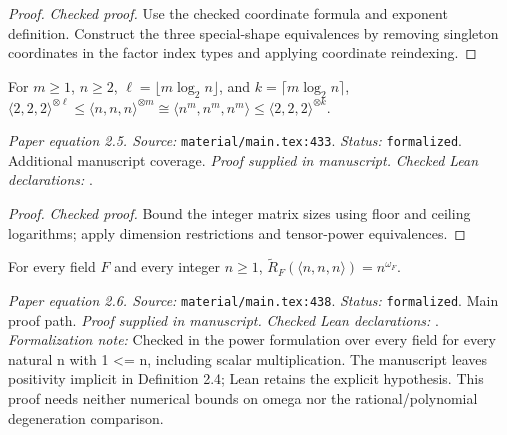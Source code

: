 \begin{proof}
\leanok
{}
\textit{Checked proof.} Use the checked coordinate formula and exponent definition. Construct the three special-shape equivalences by removing singleton coordinates in the factor index types and applying coordinate reindexing.
\end{proof}

\renewcommand{\thetheorem}{2.5}
\begin{equationresult}
\label{eq:n-matmul-to-2}
\manuscriptproof
{}
\leanok
For $m\ge1$, $n\ge2$, $\ell=\lfloor m\log_2n\rfloor$, and $k=\lceil m\log_2n\rceil$, $\langle2,2,2\rangle^{\otimes\ell}\le\langle n,n,n\rangle^{\otimes m}\cong\langle n^m,n^m,n^m\rangle\le\langle2,2,2\rangle^{\otimes k}$.
\end{equationresult}

\noindent\textit{Paper equation 2.5. Source:} \texttt{material/main.tex:433}.
\textit{Status:} \texttt{formalized}. Additional manuscript coverage.
\textit{Proof supplied in manuscript.}
\textit{Checked Lean declarations:} .

\begin{proof}
\leanok
{}
\textit{Checked proof.} Bound the integer matrix sizes using floor and ceiling logarithms; apply dimension restrictions and tensor-power equivalences.
\end{proof}

\renewcommand{\thetheorem}{2.6}
\begin{equationresult}
\label{eq:omega-log-n}
\manuscriptproof
{}
\leanok
{}
For every field $F$ and every integer $n\ge1$, $\widetilde R_F(\langle n,n,n\rangle)=n^{\omega_F}$.
\end{equationresult}

\noindent\textit{Paper equation 2.6. Source:} \texttt{material/main.tex:438}.
\textit{Status:} \texttt{formalized}. Main proof path.
\textit{Proof supplied in manuscript.}
\textit{Checked Lean declarations:} .
\textit{Formalization note:} Checked in the power formulation over every field for every natural n with 1 <= n, including scalar multiplication. The manuscript leaves positivity implicit in Definition 2.4; Lean retains the explicit hypothesis. This proof needs neither numerical bounds on omega nor the rational/polynomial degeneration comparison.

